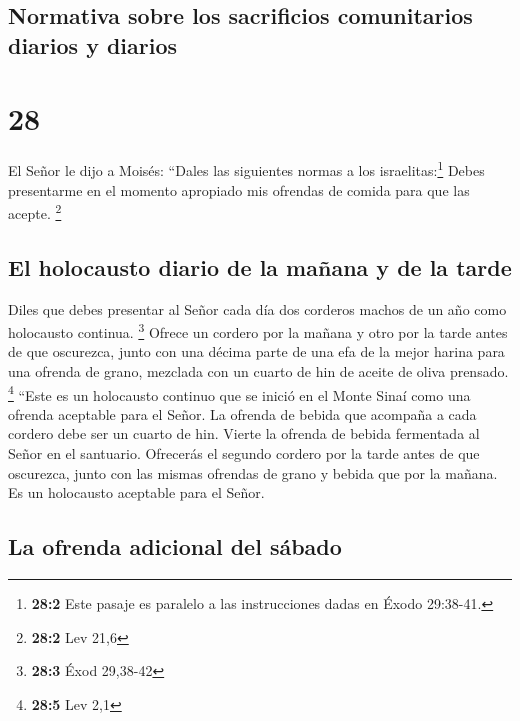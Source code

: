 \hypertarget{normativa-sobre-los-sacrificios-comunitarios-diarios-y-diarios}{%
\subsection{Normativa sobre los sacrificios comunitarios diarios y
diarios}\label{normativa-sobre-los-sacrificios-comunitarios-diarios-y-diarios}}

\hypertarget{section-27}{%
\section{28}\label{section-27}}

 El Señor le dijo a Moisés:  ``Dales las
siguientes normas a los israelitas:\footnote{\textbf{28:2} Este pasaje
  es paralelo a las instrucciones dadas en Éxodo 29:38-41.} Debes
presentarme en el momento apropiado mis ofrendas de comida para que las
acepte. \footnote{\textbf{28:2} Lev 21,6}

\hypertarget{el-holocausto-diario-de-la-mauxf1ana-y-de-la-tarde}{%
\subsection{El holocausto diario de la mañana y de la
tarde}\label{el-holocausto-diario-de-la-mauxf1ana-y-de-la-tarde}}

 Diles que debes presentar al Señor cada día dos corderos
machos de un año como holocausto continua. \footnote{\textbf{28:3} Éxod
  29,38-42}  Ofrece un cordero por la mañana y otro por la
tarde antes de que oscurezca,  junto con una décima parte
de una efa de la mejor harina para una ofrenda de grano, mezclada con un
cuarto de hin de aceite de oliva prensado. \footnote{\textbf{28:5} Lev
  2,1}  ``Este es un holocausto continuo que se inició en
el Monte Sinaí como una ofrenda aceptable para el Señor. 
La ofrenda de bebida que acompaña a cada cordero debe ser un cuarto de
hin. Vierte la ofrenda de bebida fermentada al Señor en el santuario.
 Ofrecerás el segundo cordero por la tarde antes de que
oscurezca, junto con las mismas ofrendas de grano y bebida que por la
mañana. Es un holocausto aceptable para el Señor.

\hypertarget{la-ofrenda-adicional-del-suxe1bado}{%
\subsection{La ofrenda adicional del
sábado}\label{la-ofrenda-adicional-del-suxe1bado}}


